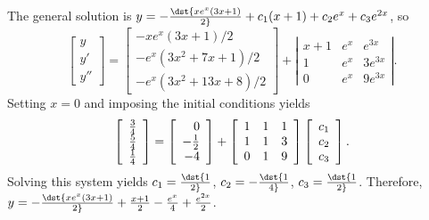 \documentclass[dvips]{book}
\numberwithin{example}{section}
\numberwithin{equation}{section}
\numberwithin{theorem}{section}
\numberwithin{table}{section}
\numberwithin{figure}{section}
\newcommand{\threecol}[3]{\left[\begin{array}{r}#1\\#2\\#3\end{array}\right]}
\newcommand{\threebythree}[9]{\left[\begin{array}{rrr}
#1&#2&#3\\#4&#5&#6\\#7&#8&#9\end{array}\right]}
\begin{document}
The general solution is
$y=-\dst{xe^x(3x+1)\over2}+c_1(x+1)+c_2e^x+c_3e^{2x}$, so
$$
\left[\begin{array}{l}y\\y'\\y''
\end{array}\right]=
\left[\begin{array}{c}
-xe^x(3x+1)/2\\
-e^x(3x^2+7x+1)/2\\
-e^x(3x^2+13x+8)/2
\end{array}\right]+
\left|\begin{array}{cccc}
x+1&e^x&e^{3x}\\1&e^x&3e^{3x}\\0&e^x&9e^{3x}
\end{array}\right|.
$$
Setting $x=0$ and imposing the initial conditions yields
$$
\left[\begin{array}{c}
{3\over4}\\{5\over4}\\{1\over4}
\end{array}\right]=
\left[\begin{array}{r}
0\\-{1\over2}\\-4
\end{array}\right]
+\threebythree111113019\threecol{c_1}{c_2}{c_3}.
$$
Solving this system yields $c_1=\dst{1\over2}$, $c_2=-\dst{1\over4}$,
$c_3=\dst{1\over2}$. Therefore,
$y=-\dst{xe^x(3x+1)\over2}+{x+1\over2}-{e^x\over4}+{e^{2x}\over2}$.
\end{document}
